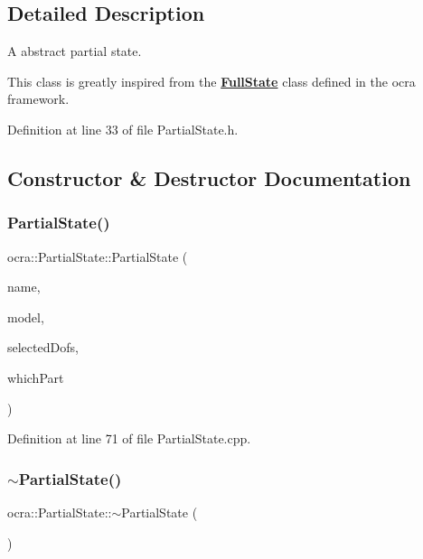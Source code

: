 \subsection{Detailed Description}
A abstract partial state. 

This class is greatly inspired from the {\bfseries \hyperlink{classocra_1_1FullState}{Full\+State}} class defined in the ocra framework. 

Definition at line 33 of file Partial\+State.\+h.



\subsection{Constructor \& Destructor Documentation}
\hypertarget{classocra_1_1PartialState_ab6f225c821033965da2ccd5924c23915}{}\label{classocra_1_1PartialState_ab6f225c821033965da2ccd5924c23915} 
\subsubsection{\texorpdfstring{Partial\+State()}{PartialState()}}
{\footnotesize\ttfamily ocra\+::\+Partial\+State\+::\+Partial\+State (\begin{DoxyParamCaption}\item[{const std\+::string \&}]{name,  }\item[{const Model \&}]{model,  }\item[{const Eigen\+::\+Vector\+Xi \&}]{selected\+Dofs,  }\item[{int}]{which\+Part }\end{DoxyParamCaption})}



Definition at line 71 of file Partial\+State.\+cpp.

\hypertarget{classocra_1_1PartialState_a6426dc8cd115e310f16f0d244802618f}{}\label{classocra_1_1PartialState_a6426dc8cd115e310f16f0d244802618f} 
\subsubsection{\texorpdfstring{$\sim$\+Partial\+State()}{~PartialState()}}
{\footnotesize\ttfamily ocra\+::\+Partial\+State\+::$\sim$\+Partial\+State (\begin{DoxyParamCaption}{ }\end{DoxyParamCaption})\hspace{0.3cm}{\ttfamily [pure virtual]}}



